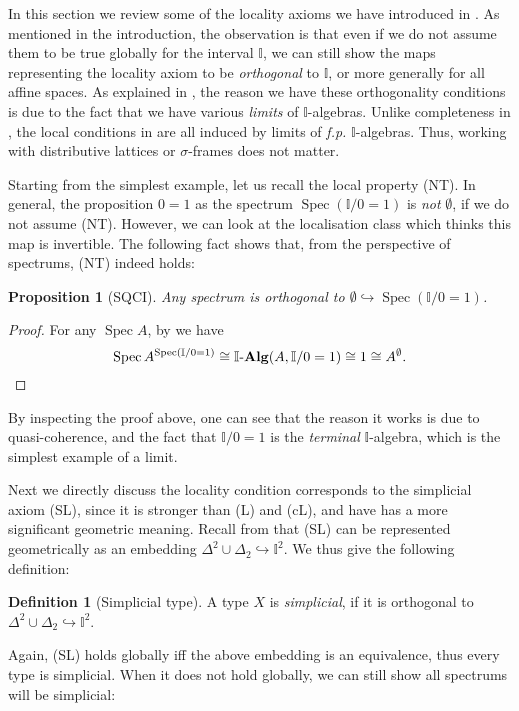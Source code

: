 \documentclass[12pt]{amsart}
\newtheorem{proposition}[theorem]{Proposition}
\theoremstyle{definition}
\newtheorem{definition}[theorem]{Definition}
\newcommand{\mb}[1]{\mathbf{#1}}
\newcommand{\mbb}[1]{\mathbb{#1}}
\newcommand{\I}{\mbb I}
\newcommand{\alg}{\text{-}\mb{Alg}}
\newcommand{\hook}{\hookrightarrow}
\newcommand{\emp}{\emptyset}
\newcommand{\spec}{\operatorname{Spec}}
\begin{document}
In this section we review some of the locality axioms we have introduced in . As mentioned in the introduction, the observation is that even if we do not assume them to be true globally for the interval $\I$, we can still show the maps representing the locality axiom to be \emph{orthogonal} to $\I$, or more generally for all affine spaces. As explained in , the reason we have these orthogonality conditions is due to the fact that we have various \emph{limits} of $\I$-algebras. Unlike completeness in , the local conditions in  are all induced by limits of \emph{f.p.} $\I$-algebras. Thus, working with distributive lattices or $\sigma$-frames does not matter.

Starting from the simplest example, let us recall the local property (NT). In general, the proposition $0 = 1$ as the spectrum $\spec(\I/0=1)$ is \emph{not} $\emp$, if we do not assume (NT). However, we can look at the localisation class which thinks this map is invertible. The following fact shows that, from the perspective of spectrums, (NT) indeed holds:

\begin{proposition}[SQCI]\label{specisnontrivial}
  Any spectrum is orthogonal to $\emp \hook \spec(\I/0=1)$.
\end{proposition}
\begin{proof}
  For any $\spec A$, by  we have
  \[ \spec A^{\spec(\I/0=1)} \cong \I\alg(A,\I/0=1) \cong 1 \cong A^\emp. \qedhere \]
\end{proof}

By inspecting the proof above, one can see that the reason it works is due to quasi-coherence, and the fact that $\I/0=1$ is the \emph{terminal} $\I$-algebra, which is the simplest example of a limit.

Next we directly discuss the locality condition corresponds to the simplicial axiom (SL), since it is stronger than (L) and (cL), and have has a more significant geometric meaning. Recall from  that (SL) can be represented geometrically as an embedding $\Delta^2\cup\Delta_2 \hook \I^2$. We thus give the following definition:

\begin{definition}[Simplicial type]
  A type $X$ is \emph{simplicial}, if it is orthogonal to $\Delta^2 \cup \Delta_2 \hook \I^2$.
\end{definition}

Again, (SL) holds globally iff the above embedding is an equivalence, thus every type is simplicial. When it does not hold globally, we can still show all spectrums will be simplicial:
\end{document}
